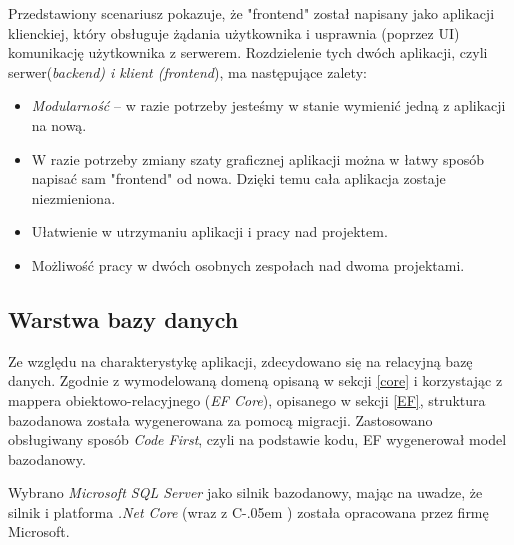\documentclass[12pt]{article}
\newcommand{\Csharp}{%
  {\settoheight{\dimen0}{C}C\kern-.05em \resizebox{!}{\dimen0}{\raisebox{\depth}{\# }}}}
\numberwithin{figure}{section}
\begin{document}
\begin{sloppypar}
Przedstawiony scenariusz pokazuje, że "frontend" został napisany jako aplikacji klienckiej, który obsługuje żądania użytkownika i usprawnia (poprzez UI) komunikację użytkownika z serwerem. 
Rozdzielenie tych dwóch aplikacji, czyli serwer(\textit{backend) i klient (\textit{frontend}}), ma następujące zalety:
\begin{itemize}
    \item \textit{Modularność} -- w razie potrzeby jesteśmy w stanie wymienić jedną z aplikacji na nową.
    \item W razie potrzeby zmiany szaty graficznej aplikacji można w łatwy sposób napisać sam "frontend" od nowa. Dzięki temu cała aplikacja zostaje niezmieniona.
    \item Ułatwienie w utrzymaniu aplikacji i pracy nad projektem.
    \item Możliwość pracy w dwóch osobnych zespołach nad dwoma projektami.
\end{itemize}
    

\subsection{Warstwa bazy danych}
Ze względu na charakterystykę aplikacji, zdecydowano się na relacyjną bazę danych.
Zgodnie z wymodelowaną domeną opisaną w sekcji \ref{core} i korzystając z mappera obiektowo-relacyjnego (\textit{EF Core}), opisanego w sekcji \ref{EF}, struktura bazodanowa została wygenerowana za pomocą migracji. Zastosowano obsługiwany sposób \textit{Code First}, czyli na podstawie kodu, EF wygenerował model bazodanowy.
    
Wybrano \textit{Microsoft SQL Server} jako silnik bazodanowy, mając na uwadze, że silnik i platforma \textit{.Net Core} (wraz z \Csharp) została opracowana przez firmę Microsoft. 
    

\end{sloppypar}
\end{document}
